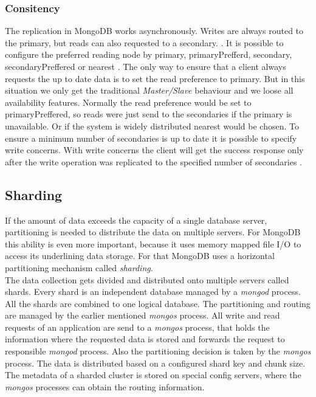 \subsubsection{Consitency}
The replication in MongoDB works asynchronously. Writes are always routed to the primary, but reads can also requested to a secondary. . It is possible to configure the preferred reading node by primary, primaryPrefferd, secondary, secondaryPreffered or nearest \cite{theguide}. The only way to ensure that a client always requests the up to date data is to set the read preference to primary. But in this situation we only get the traditional \textit{Master/Slave} behaviour and we loose all availability features. Normally the read preference would be set to primaryPreffered, so reads were just send to the secondaries if the primary is unavailable. Or if the system is widely distributed nearest would be chosen.
To ensure a minimum number of secondaries is up to date it is possible to specify write concerns. With write concerns the client will get the success response only after the write operation was replicated to the specified number of secondaries \cite{pracmong}.

\subsection{Sharding}
If the amount of data exceeds the capacity of a single database server, partitioning is needed to distribute the data on multiple servers. For MongoDB this ability is even more important, because it uses memory mapped file I/O to access its underlining data storage\cite{theguide}. For that MongoDB uses a horizontal partitioning mechanism called \textit{sharding}.\\
The data collection gets divided and distributed onto multiple servers called shards. Every shard is an independent database managed by a \textit{mongod} process. All the shards are combined to one logical database. The partitioning and routing are managed by the earlier mentioned \textit{mongos} process. All write and read requests of an application are send to a \textit{mongos} process, that holds the information where the requested data is stored and forwards the request to responsible \textit{mongod} process. Also the partitioning decision is taken by the \textit{mongos} process. The data is distributed based on a configured shard key and chunk size. The metadata of a sharded cluster is stored on special config servers, where the \textit{mongos} processes can obtain the routing information.

